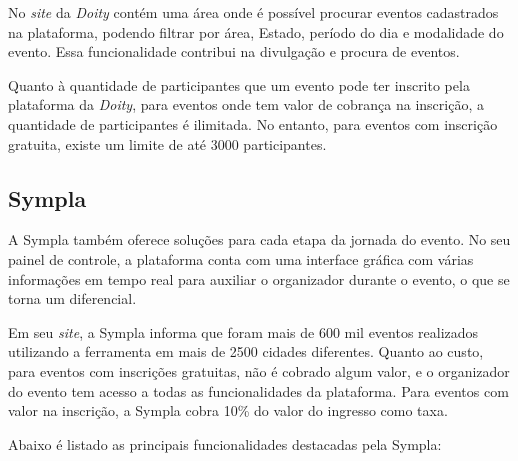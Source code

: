 No \textit{site} da \textit{Doity} contém uma área onde é possível procurar eventos cadastrados na plataforma, podendo filtrar por área, Estado, período do dia e modalidade do evento. Essa funcionalidade contribui na divulgação e procura de eventos.

Quanto à quantidade de participantes que um evento pode ter inscrito pela plataforma da \textit{Doity}, para eventos onde tem valor de cobrança na inscrição, a quantidade de participantes é ilimitada. No entanto, para eventos com inscrição gratuita, existe um limite de até 3000 participantes. 

\subsection{Sympla}

A Sympla também oferece soluções para cada etapa da jornada do evento. No seu painel de controle, a plataforma conta com uma interface gráfica com várias informações em tempo real para auxiliar o organizador durante o evento, o que se torna um diferencial.

Em seu \textit{site}, a Sympla informa que foram mais de 600 mil eventos realizados utilizando a ferramenta em mais de 2500 cidades diferentes. Quanto ao custo, para eventos com inscrições gratuitas, não é cobrado algum valor, e o organizador do evento tem acesso a todas as funcionalidades da plataforma. Para eventos com valor na inscrição, a Sympla cobra 10\% do valor do ingresso como taxa.

Abaixo é listado as principais funcionalidades destacadas pela Sympla:

